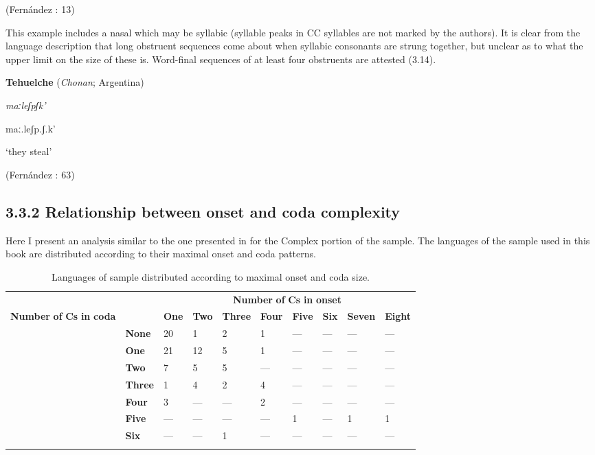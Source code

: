 (Fernández \citealt{GarayHernández2006}: 13)
\z

This example includes a nasal which may be syllabic (syllable peaks in CC syllables are not marked by the authors). It is clear from the language description that long obstruent sequences come about when syllabic consonants are strung together, but unclear as to what the upper limit on the size of these is. Word-final sequences of at least four obstruents are attested (3.14).

\ea\label{ex:(3.14)}
   \textbf{Tehuelche} (\textit{Chonan}; Argentina)

\textit{maːleʃpʃk’}

maː.leʃp.ʃ.k’

‘they steal’

(Fernández \citealt{GarayHernández2006}: 63)

\z

\subsection{3.3.2 Relationship between onset and coda complexity} 

  Here I present an analysis similar to the one presented in  for the Complex portion of the \citet{Maddieson2013a} sample. The languages of the sample used in this book are distributed according to their maximal onset and coda patterns.

\begin{table}
\begin{tabularx}{\textwidth}{XXXXXXXXXX}
\lsptoprule

{} &  & \multicolumn{8}{c}{ \textbf{Number} \textbf{of} \textbf{Cs} \textbf{in} \textbf{onset}}\\
{ \textbf{Number} \textbf{of} \textbf{Cs} \textbf{in} \textbf{coda}} &  & \textbf{One} & \textbf{Two} & \textbf{Three} & \textbf{Four} & \textbf{Five} & \textbf{Six} & \textbf{Seven} & \textbf{Eight}\\
& \textbf{None} & 20 & 1 & 2 & 1 & — & — & — & —\\
\hhline{~---------} & \textbf{One} & 21 & 12 & 5 & 1 & — & — & — & —\\
\hhline{~---------} & \textbf{Two} & 7 & 5 & 5 & — & — & — & — & —\\
\hhline{~---------} & \textbf{Three} & 1 & 4 & 2 & 4 & — & — & — & —\\
\hhline{~---------} & \textbf{Four} & 3 & — & — & 2 & — & — & — & —\\
\hhline{~---------} & \textbf{Five} & — & — & — & — & 1 & — & 1 & 1\\
\hhline{~---------} & \textbf{Six} & — & — & 1 & — & — & — & — & —\\
\hhline{~---------}
\lspbottomrule
\end{tabularx}
\caption{\label{3.2}Languages of sample distributed according to maximal onset and coda size.}
\end{table}

